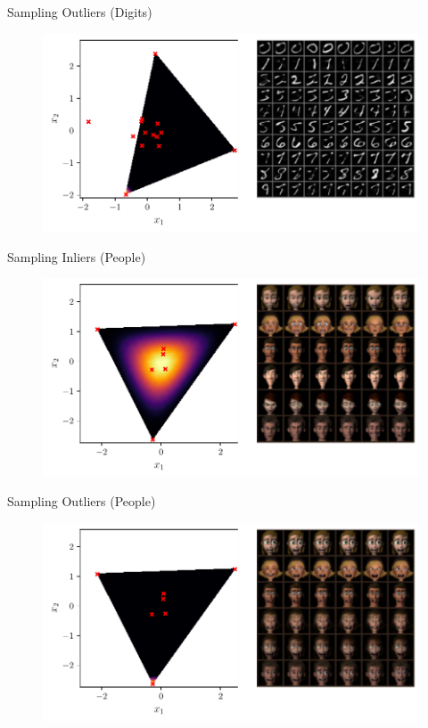 \documentclass[aspectratio=169]{beamer}
\begin{document}
\begin{frame}{Sampling Outliers (Digits)}
\begin{figure}[htpb]
	\includegraphics[height=0.7\textheight]{figures/samples/aa_emnist3.pdf}
\end{figure}
\end{frame}

\begin{frame}{Sampling Inliers (People)}
\begin{figure}[htpb]
	\includegraphics[height=0.7\textheight]{figures/samples/aa_ferg.pdf}
\end{figure}
\end{frame}

\begin{frame}{Sampling Outliers (People)}
\begin{figure}[htpb]
	\includegraphics[height=0.7\textheight]{figures/samples/aa_ferg1.pdf}
\end{figure}
\end{frame}
\end{document}
